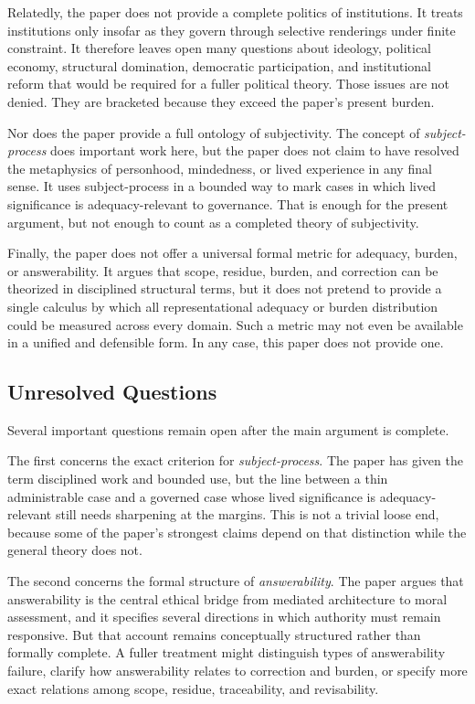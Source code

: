 \documentclass[11pt]{article}
\renewcommand{\emph}[1]{\textit{#1}}
\begin{document}
Relatedly, the paper does not provide a complete politics of institutions. It treats institutions only insofar as they govern through selective renderings under finite constraint. It therefore leaves open many questions about ideology, political economy, structural domination, democratic participation, and institutional reform that would be required for a fuller political theory. Those issues are not denied. They are bracketed because they exceed the paper's present burden.

Nor does the paper provide a full ontology of subjectivity. The concept of \emph{subject-process} does important work here, but the paper does not claim to have resolved the metaphysics of personhood, mindedness, or lived experience in any final sense. It uses subject-process in a bounded way to mark cases in which lived significance is adequacy-relevant to governance. That is enough for the present argument, but not enough to count as a completed theory of subjectivity.

Finally, the paper does not offer a universal formal metric for adequacy, burden, or answerability. It argues that scope, residue, burden, and correction can be theorized in disciplined structural terms, but it does not pretend to provide a single calculus by which all representational adequacy or burden distribution could be measured across every domain. Such a metric may not even be available in a unified and defensible form. In any case, this paper does not provide one.

\subsection{Unresolved Questions}

Several important questions remain open after the main argument is complete.

The first concerns the exact criterion for \emph{subject-process}. The paper has given the term disciplined work and bounded use, but the line between a thin administrable case and a governed case whose lived significance is adequacy-relevant still needs sharpening at the margins. This is not a trivial loose end, because some of the paper's strongest claims depend on that distinction while the general theory does not.

The second concerns the formal structure of \emph{answerability}. The paper argues that answerability is the central ethical bridge from mediated architecture to moral assessment, and it specifies several directions in which authority must remain responsive. But that account remains conceptually structured rather than formally complete. A fuller treatment might distinguish types of answerability failure, clarify how answerability relates to correction and burden, or specify more exact relations among scope, residue, traceability, and revisability.
\end{document}
